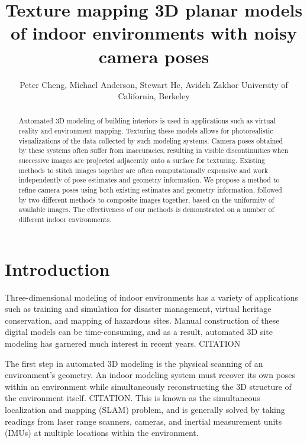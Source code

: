 \documentclass[]{spie}  %
\title{Texture mapping 3D planar models of indoor environments with noisy camera poses}
\author{Peter Cheng, Michael Anderson, Stewart He, Avideh Zakhor
\skiplinehalf
University of California, Berkeley\\
}
\begin{document}
\maketitle

\begin{abstract}
  Automated 3D modeling of building interiors is used in applications
  such as virtual reality and environment mapping. Texturing these
  models allows for photorealistic visualizations of the data
  collected by such modeling systems. Camera poses obtained by these
  systems often suffer from inaccuracies, resulting in visible
  discontinuities when successive images are projected adjacently onto
  a surface for texturing. Existing methods to stitch images together
  are often computationally expensive and work independently of pose
  estimates and geometry information. We propose a method to refine
  camera poses using both existing estimates and geometry information,
  followed by two different methods to composite images together,
  based on the uniformity of available images. The effectiveness of
  our methods is demonstrated on a number of different indoor
  environments.
\end{abstract}



\section{Introduction}
\label{sec:introduction} %
Three-dimensional modeling of indoor environments has a variety of
applications such as training and simulation for disaster management,
virtual heritage conservation, and mapping of hazardous sites. Manual
construction of these digital models can be time-consuming, and as a
result, automated 3D site modeling has garnered much interest in
recent years. CITATION

The first step in automated 3D modeling is the physical scanning of an
environment's geometry. An indoor modeling system must recover its own
poses within an environment while simultaneously reconstructing the 3D
structure of the environment itself. CITATION. This is known as the
simultaneous localization and mapping (SLAM) problem, and is generally
solved by taking readings from laser range scanners, cameras, and
inertial measurement units (IMUs) at multiple locations within the
environment.
\end{document}
